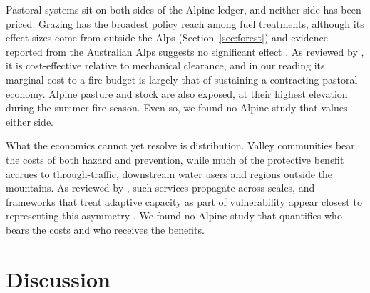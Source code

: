 \documentclass[11pt,a4paper]{article}
\begin{document}
Pastoral systems sit on both sides of the Alpine ledger, and neither side has been priced. Grazing has the broadest policy reach among fuel treatments, although its effect sizes come from outside the Alps (Section~\ref{sec:forest}) and evidence reported from the Australian Alps suggests no significant effect \citep{lockwood_biodiversity_2014}. As reviewed by \citet{xu_how_2026}, it is cost-effective relative to mechanical clearance, and in our reading its marginal cost to a fire budget is largely that of sustaining a contracting pastoral economy. Alpine pasture and stock are also exposed, at their highest elevation during the summer fire season. Even so, we found no Alpine study that values either side.

What the economics cannot yet resolve is distribution. Valley communities bear the costs of both hazard and prevention, while much of the protective benefit accrues to through-traffic, downstream water users and regions outside the mountains. As reviewed by \citet{vukomanovic_systematic_2019}, such services propagate across scales, and frameworks that treat adaptive capacity as part of vulnerability appear closest to representing this asymmetry \citep{riviere_mapping_2023, lecinadiaz_assessing_2021}. We found no Alpine study that quantifies who bears the costs and who receives the benefits.

\section{Discussion}
\label{sec:discussion}
\end{document}
